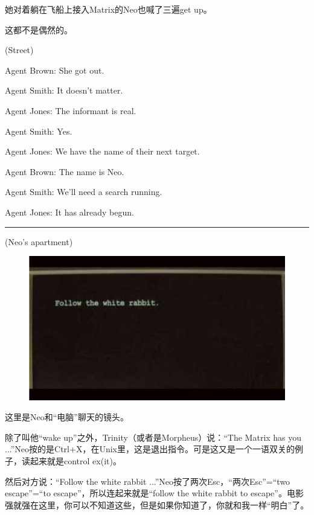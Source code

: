 \documentclass{ctexart}
\newcommand{\myparsep}{\noindent \rule[0.5ex]{\linewidth}{1pt}}
\newenvironment{myquote}{\color{green} \setlength{\leftskip}{6em} \setlength{\rightskip}{4em} \setlength{\parindent}{-2em}}{\par}
\begin{document}
她对着躺在飞船上接入Matrix的Neo也喊了三遍get up。

这都不是偶然的。

\begin{myquote}
(Street)

Agent Brown: She got out.

Agent Smith: It doesn't matter.

Agent Jones: The informant is real.

Agent Smith: Yes.

Agent Jones: We have the name of their next target.

Agent Brown: The name is Neo.

Agent Smith: We'll need a search running.

Agent Jones: It has already begun.
\end{myquote}

\myparsep

\begin{myquote}
(Neo's apartment)
\end{myquote}

\begin{figure}[htb]
\centering
\includegraphics[width=0.5\linewidth]{fig/read_Matrix-3}
\end{figure}

这里是Neo和“电脑”聊天的镜头。

除了叫他“wake up”之外，Trinity（或者是Morpheus）说：“The Matrix has you ...”Neo按的是Ctrl+X，在Unix里，这是退出指令。可是这又是一个一语双关的例子，读起来就是control ex(it)。

然后对方说：“Follow the white rabbit ...”Neo按了两次Esc，“两次Esc”=“two escape”=“to escape”，所以连起来就是“follow the white rabbit to escape”。电影强就强在这里，你可以不知道这些，但是如果你知道了，你就和我一样“明白”了。
\end{document}
